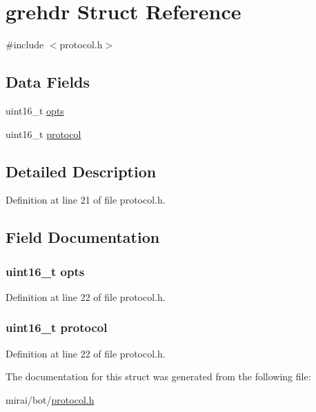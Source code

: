 \hypertarget{structgrehdr}{}\section{grehdr Struct Reference}
\label{structgrehdr}


{\ttfamily \#include $<$protocol.\+h$>$}

\subsection*{Data Fields}
\begin{DoxyCompactItemize}
\item 
uint16\+\_\+t \hyperlink{structgrehdr_a603d5a096df0308ac97dbf3e7d808733}{opts}
\item 
uint16\+\_\+t \hyperlink{structgrehdr_ab551400c74271f35d0c79f81d29cffbb}{protocol}
\end{DoxyCompactItemize}


\subsection{Detailed Description}


Definition at line 21 of file protocol.\+h.



\subsection{Field Documentation}
\subsubsection[{\texorpdfstring{opts}{opts}}]{\setlength{\rightskip}{0pt plus 5cm}uint16\+\_\+t opts}\hypertarget{structgrehdr_a603d5a096df0308ac97dbf3e7d808733}{}\label{structgrehdr_a603d5a096df0308ac97dbf3e7d808733}


Definition at line 22 of file protocol.\+h.

\subsubsection[{\texorpdfstring{protocol}{protocol}}]{\setlength{\rightskip}{0pt plus 5cm}uint16\+\_\+t protocol}\hypertarget{structgrehdr_ab551400c74271f35d0c79f81d29cffbb}{}\label{structgrehdr_ab551400c74271f35d0c79f81d29cffbb}


Definition at line 22 of file protocol.\+h.



The documentation for this struct was generated from the following file\+:\begin{DoxyCompactItemize}
\item 
mirai/bot/\hyperlink{protocol_8h}{protocol.\+h}\end{DoxyCompactItemize}
